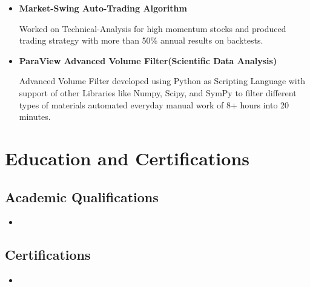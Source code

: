 \documentclass[11pt,a4paper,sans]{moderncv}        %
\begin{document}
{\begin{itemize}
\item {\textbf{Market-Swing Auto-Trading Algorithm}

\small{Worked on Technical-Analysis for high momentum stocks and produced trading strategy with more than 50\% annual results on backtests.}}

\item{\textbf{ParaView Advanced Volume Filter(Scientific Data Analysis)}

\vspace{3pt}

\small{Advanced Volume Filter developed using Python as Scripting Language
with support of other Libraries like Numpy, Scipy, and SymPy to filter different types of materials automated everyday manual work of 8+ hours into 20 minutes.
}}

\end{itemize}

\section{Education and Certifications}

\vspace{5pt}

\subsection{Academic Qualifications}

\vspace{5pt}

\begin{itemize}

\item{}

\end{itemize}


\subsection{Certifications}

\vspace{5pt}

\begin{itemize}

\item{}


\end{itemize}}
\end{document}
